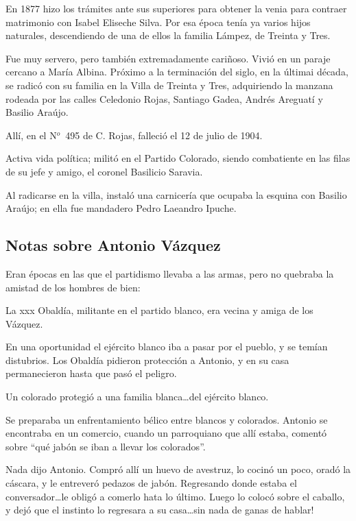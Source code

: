 \documentclass{article}
\begin{document}
\bigbreak{}

En 1877 hizo los trámites ante sus superiores para obtener la venia para contraer matrimonio con Isabel Eliseche Silva. Por esa época tenía ya varios hijos naturales, descendiendo de una de ellos la familia Lámpez, de Treinta y Tres.

Fue muy servero, pero también extremadamente cariñoso. Vivió en un paraje cercano a María Albina. Próximo a la terminación del siglo, en la últimai década, se radicó con su familia en la Villa de Treinta y Tres, adquiriendo la manzana rodeada por las calles Celedonio Rojas, Santiago Gadea, Andrés Areguatí y Basilio Araújo.

Allí, en el N$^o$~495 de C. Rojas, falleció el 12 de julio de 1904.

Activa vida política; militó en el Partido Colorado, siendo combatiente en las filas de su jefe y amigo, el coronel Basilicio Saravia.

Al radicarse en la villa, instaló una carnicería que ocupaba la esquina con Basilio Araújo; en ella fue mandadero Pedro Laeandro Ipuche.

\subsection{Notas sobre Antonio Vázquez}

Eran épocas en las que el partidismo llevaba a las armas, pero no quebraba la amistad de los hombres de bien:

La xxx Obaldía, militante en el partido blanco, era vecina y amiga de los Vázquez.

En una oportunidad el ejército blanco iba a pasar por el pueblo, y se temían distubrios. Los Obaldía pidieron protección a Antonio, y en su casa permanecieron hasta que pasó el peligro.


Un colorado protegió a una familia blanca\ldots del ejército blanco.

\bigbreak{}

Se preparaba un enfrentamiento bélico entre blancos y colorados. Antonio se encontraba en un comercio, cuando un parroquiano que allí estaba, comentó sobre ``qué jabón se iban a llevar los colorados''.

Nada dijo Antonio. Compró allí un huevo de avestruz, lo cocinó un poco, oradó la cáscara, y le entreveró pedazos de jabón. Regresando donde estaba el conversador\ldots le obligó a comerlo hata lo último. Luego lo colocó sobre el caballo, y dejó que el instinto lo regresara a su casa\ldots sin nada de ganas de hablar!
\end{document}
